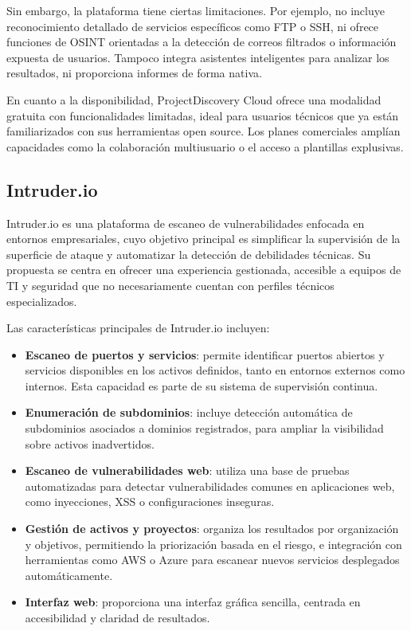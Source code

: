 \begin{parskipenv}
Sin embargo, la plataforma tiene ciertas limitaciones. Por ejemplo, no incluye reconocimiento detallado de servicios específicos como FTP o SSH, ni ofrece funciones de OSINT orientadas a la detección de correos filtrados o información expuesta de usuarios. Tampoco integra asistentes inteligentes para analizar los resultados, ni proporciona informes de forma nativa.

En cuanto a la disponibilidad, ProjectDiscovery Cloud ofrece una modalidad gratuita con funcionalidades limitadas, ideal para usuarios técnicos que ya están familiarizados con sus herramientas open source. Los planes comerciales amplían capacidades como la colaboración multiusuario o el acceso a plantillas explusivas.

\subsection{Intruder.io}

Intruder.io es una plataforma de escaneo de vulnerabilidades enfocada en entornos empresariales, cuyo objetivo principal es simplificar la supervisión de la superficie de ataque y automatizar la detección de debilidades técnicas. Su propuesta se centra en ofrecer una experiencia gestionada, accesible a equipos de TI y seguridad que no necesariamente cuentan con perfiles técnicos especializados.

Las características principales de Intruder.io incluyen:

\begin{itemize}
  \item \textbf{Escaneo de puertos y servicios}: permite identificar puertos abiertos y servicios disponibles en los activos definidos, tanto en entornos externos como internos. Esta capacidad es parte de su sistema de supervisión continua.
  \item \textbf{Enumeración de subdominios}: incluye detección automática de subdominios asociados a dominios registrados, para ampliar la visibilidad sobre activos inadvertidos.
  \item \textbf{Escaneo de vulnerabilidades web}: utiliza una base de pruebas automatizadas para detectar vulnerabilidades comunes en aplicaciones web, como inyecciones, XSS o configuraciones inseguras.
  \item \textbf{Gestión de activos y proyectos}: organiza los resultados por organización y objetivos, permitiendo la priorización basada en el riesgo, e integración con herramientas como AWS o Azure para escanear nuevos servicios desplegados automáticamente.
  \item \textbf{Interfaz web}: proporciona una interfaz gráfica sencilla, centrada en accesibilidad y claridad de resultados.
\end{itemize}


\end{parskipenv}
